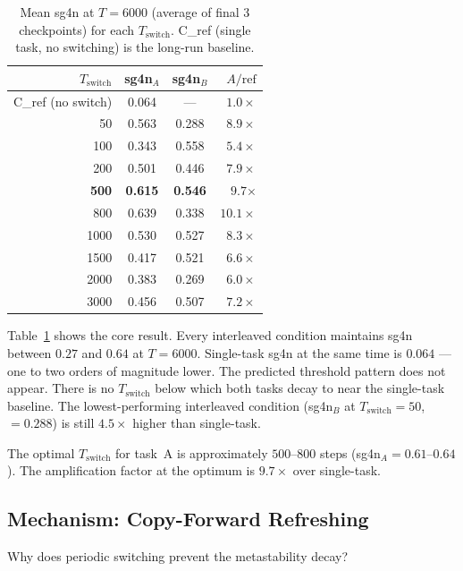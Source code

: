 \documentclass[11pt]{article}
\begin{document}
\begin{table}[h]
  \centering
  \caption{Mean sg4n at $T = 6000$ (average of final 3 checkpoints) for each
           $T_\mathrm{switch}$.  C\_ref (single task, no switching) is the
           long-run baseline.}
  \label{tab:sweep}
  \small
  \begin{tabular}{rccr}
    \toprule
    $T_\mathrm{switch}$ & sg4n$_A$ & sg4n$_B$ & $A / \mathrm{ref}$ \\
    \midrule
    C\_ref (no switch) & 0.064 & --- & $1.0\times$ \\
    \midrule
     50   & 0.563 & 0.288 & $8.9\times$ \\
    100   & 0.343 & 0.558 & $5.4\times$ \\
    200   & 0.501 & 0.446 & $7.9\times$ \\
    \textbf{500}   & \textbf{0.615} & \textbf{0.546} & $\mathbf{9.7}\boldsymbol{\times}$ \\
    800   & 0.639 & 0.338 & $10.1\times$ \\
    1000  & 0.530 & 0.527 & $8.3\times$ \\
    1500  & 0.417 & 0.521 & $6.6\times$ \\
    2000  & 0.383 & 0.269 & $6.0\times$ \\
    3000  & 0.456 & 0.507 & $7.2\times$ \\
    \bottomrule
  \end{tabular}
\end{table}

Table~\ref{tab:sweep} shows the core result.
Every interleaved condition maintains sg4n between $0.27$ and $0.64$ at $T = 6000$.
Single-task sg4n at the same time is $0.064$ --- one to two orders of magnitude lower.
The predicted threshold pattern does not appear.
There is no $T_\mathrm{switch}$ below which both tasks decay to near the single-task
baseline.
The lowest-performing interleaved condition (sg4n$_B$ at $T_\mathrm{switch} = 50$,
$= 0.288$) is still $4.5\times$ higher than single-task.

The optimal $T_\mathrm{switch}$ for task~A is approximately $500$--$800$ steps
(sg4n$_A = 0.61$--$0.64$).
The amplification factor at the optimum is $9.7\times$ over single-task.

\subsection{Mechanism: Copy-Forward Refreshing}

Why does periodic switching prevent the metastability decay?
\end{document}
